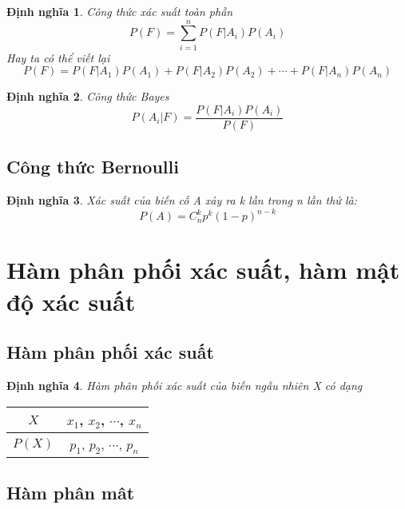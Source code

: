 \documentclass[12pt]{article}
\newtheorem{thm}{Định nghĩa}
\begin{document}
\begin{thm}
Công thức xác suất toàn phần
\begin{equation}
P(F) = \sum_{i=1}^n P(F|A_i)P(A_i)
\end{equation}
Hay ta có thể viết lại
\begin{equation}
P(F) = P(F|A_1)P(A_1) + P(F|A_2)P(A_2) + \cdots + P(F|A_n)P(A_n)
\end{equation}
\end{thm}

\begin{thm}
Công thức Bayes
\begin{equation}
P(A_i|F) = \frac{P(F|A_i)P(A_i)}{P(F)}
\end{equation}
\end{thm}

\subsection{Công thức Bernoulli}

\begin{thm}
Xác suất của biến cố A xảy ra k lần trong n lần thử là:
\begin{equation}
P(A) = C_n^k p^k (1-p)^{n-k}
\end{equation}
\end{thm}

\section{Hàm phân phối xác suất, hàm mật độ xác suất}
\subsection{Hàm phân phối xác suất}
\begin{thm}
Hàm phân phối xác suất của biến ngẫu nhiên X có dạng
\end{thm}
\begin{tabular}{|c|c|}
    \hline
    $X$ & $x_1$, $x_2$, $\cdots$, $x_n$ \\
    \hline
    $P(X)$ & $p_1$, $p_2$, $\cdots$, $p_n$ \\
    \hline
  \end{tabular}

\subsection{Hàm phân mât}
\end{document}
